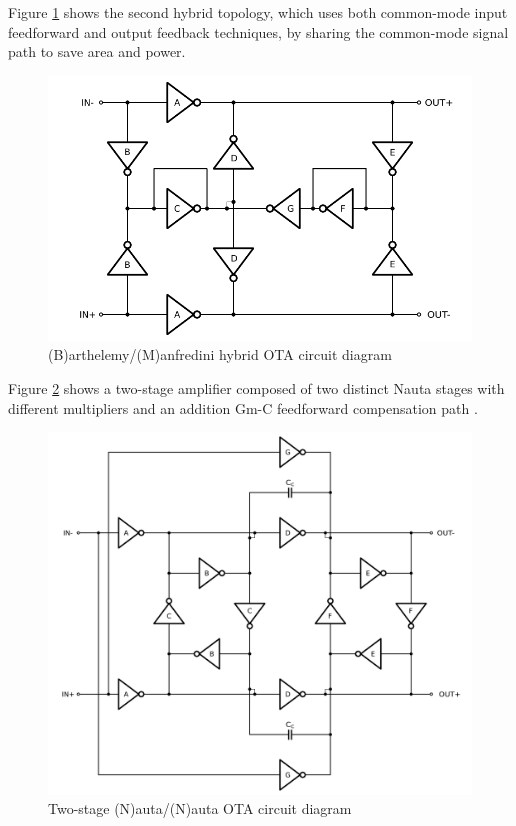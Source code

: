 \documentclass[conference]{IEEEtran}
\begin{document}
Figure \ref{fig:barthmanf:sch} shows the second hybrid topology, which uses both common-mode input feedforward and output feedback techniques, by sharing the common-mode signal path to save area and power.



\begin{figure}[!htbp]
	\centerline{\includegraphics[scale=0.50]{circuits/barthmanf.pdf}}
	\caption{(B)arthelemy/(M)anfredini hybrid OTA circuit diagram}
	\label{fig:barthmanf:sch}
\end{figure}

Figure \ref{fig:nautanauta:sch} shows a two-stage amplifier composed of two distinct Nauta stages with different multipliers and an addition Gm-C feedforward compensation path \cite{you1997multistage}.

\begin{figure}[!htbp]
	\centerline{\includegraphics[scale=0.50]{circuits/nautanauta.pdf}}
	\caption{Two-stage (N)auta/(N)auta OTA circuit diagram}
	\label{fig:nautanauta:sch}
\end{figure}
\end{document}
